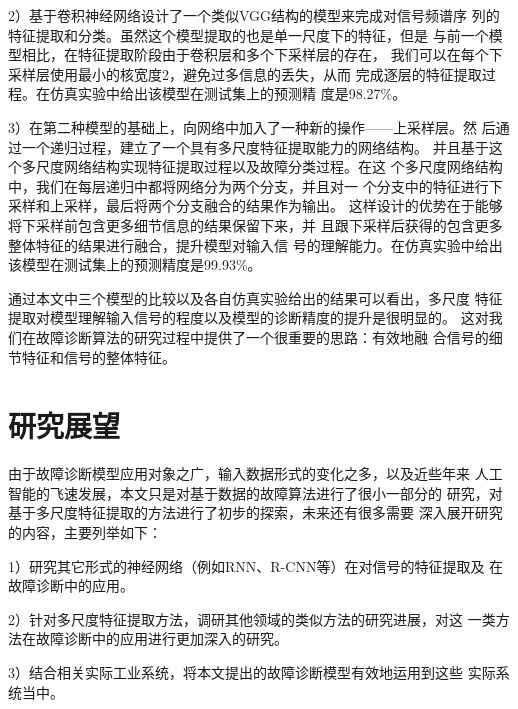 2）基于卷积神经网络设计了一个类似VGG结构的模型来完成对信号频谱序
列的特征提取和分类。虽然这个模型提取的也是单一尺度下的特征，但是
与前一个模型相比，在特征提取阶段由于卷积层和多个下采样层的存在，
我们可以在每个下采样层使用最小的核宽度2，避免过多信息的丢失，从而
完成逐层的特征提取过程。在仿真实验中给出该模型在测试集上的预测精
度是98.27\%。

3）在第二种模型的基础上，向网络中加入了一种新的操作——上采样层。然
后通过一个递归过程，建立了一个具有多尺度特征提取能力的网络结构。
并且基于这个多尺度网络结构实现特征提取过程以及故障分类过程。在这
个多尺度网络结构中，我们在每层递归中都将网络分为两个分支，并且对一
个分支中的特征进行下采样和上采样，最后将两个分支融合的结果作为输出。
这样设计的优势在于能够将下采样前包含更多细节信息的结果保留下来，并
且跟下采样后获得的包含更多整体特征的结果进行融合，提升模型对输入信
号的理解能力。在仿真实验中给出该模型在测试集上的预测精度是99.93\%。

通过本文中三个模型的比较以及各自仿真实验给出的结果可以看出，多尺度
特征提取对模型理解输入信号的程度以及模型的诊断精度的提升是很明显的。
这对我们在故障诊断算法的研究过程中提供了一个很重要的思路：有效地融
合信号的细节特征和信号的整体特征。

\section{研究展望}

由于故障诊断模型应用对象之广，输入数据形式的变化之多，以及近些年来
人工智能的飞速发展，本文只是对基于数据的故障算法进行了很小一部分的
研究，对基于多尺度特征提取的方法进行了初步的探索，未来还有很多需要
深入展开研究的内容，主要列举如下：

1）研究其它形式的神经网络（例如RNN、R-CNN等）在对信号的特征提取及
在故障诊断中的应用。

2）针对多尺度特征提取方法，调研其他领域的类似方法的研究进展，对这
一类方法在故障诊断中的应用进行更加深入的研究。

3）结合相关实际工业系统，将本文提出的故障诊断模型有效地运用到这些
实际系统当中。
